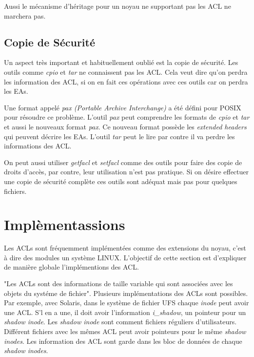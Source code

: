 \documentclass{article}
\begin{document}
Aussi le mécanisme d'héritage pour un noyau ne supportant pas les ACL ne marchera pas. 

\subsection*{Copie de Sécurité}

Un aspect très important et habituellement oublié est la copie de sécurité. Les outils comme \emph{cpio} et \emph{tar} ne connaissent pas les ACL. Cela veut dire qu'on perdra les information des ACL, si on en fait ces opérations avec ces outils car on perdra les EAs.

Une format appelé \emph{pax (Portable Archive Interchange)} a été défini pour POSIX pour résoudre ce problème. L'outil \emph{pax} peut comprendre les formats de \emph{cpio} et \emph{tar} et aussi le nouveaux format \emph{pax}. Ce nouveau format possède les \emph{extended headers} qui peuvent décrire les EAs. L'outil \emph{tar} peut le lire par contre il va perdre les informations des ACL. 

On peut aussi utiliser \emph{getfacl} et \emph{setfacl} comme des outils pour faire des copie de droits d'accès, par contre, leur utilisation n'est pas pratique. Si on désire effectuer une copie de sécurité complète ces outils sont adéquat mais pas pour quelques fichiers. 

\section{Implèmentassions}
 
Les ACLs sont fréquemment implémentées comme des extensions du noyau, c'est à dire des modules un système LINUX. L'objectif de cette section est d'expliquer de manière globale l'implémentions des ACL. 
 
"Les ACLs sont des informations de taille variable qui sont associées avec les objets du systéme de fichier"\cite{aclsuse}. Plusieurs implémentations des ACLs sont possibles. Par exemple, avec Solaris, dans le système de fichier UFS\cite{acl_permission} chaque \emph{inode} peut avoir une ACL. S'l en a une, il doit avoir l'information \emph{i\_shadow}, un pointeur pour un \emph{shadow inode}. Les \emph{shadow inode} sont comment fichiers réguliers d'utilisateurs. Différent fichiers avec les mêmes ACL peut avoir pointeurs pour le même \emph{shadow inodes}. Les information des ACL sont garde dans les bloc de données de chaque \emph{shadow inodes}.
 
\end{document}
